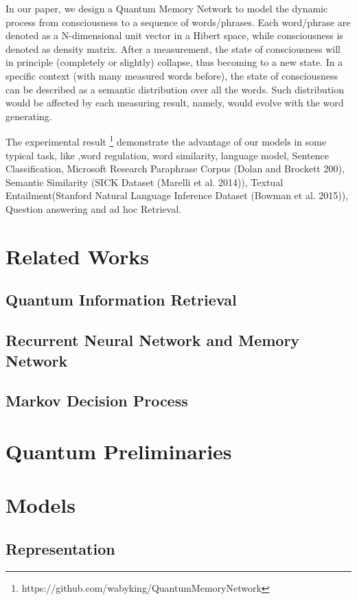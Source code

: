 \documentclass{sig-alternate-05-2015}
\begin{document}
In our paper, we design a Quantum Memory Network to model the dynamic process from consciousness to a sequence of words/phrases. Each word/phrase are denoted as a N-dimensional unit vector in a Hibert space, while consciousness is denoted as density matrix. After a measurement, the  state of consciousness will  in principle (completely or slightly) collapse, thus becoming to a new state.  In a specific context (with many measured words before), the state of consciousness can be described as a semantic distribution over all the words. Such distribution would be affected by each measuring result, namely, would evolve with the word generating.

The experimental result \footnote{https://github.com/wabyking/QuantumMemoryNetwork } demonstrate the advantage of our models in some typical task, like ,word regulation, word similarity, language model, Sentence Classification,  Microsoft Research Paraphrase Corpus (Dolan and Brockett 200),  Semantic Similarity (SICK Dataset (Marelli et al. 2014)), Textual Entailment(Stanford Natural Language Inference Dataset (Bowman et al. 2015)), Question answering and ad hoc Retrieval.





\section{Related Works}
\subsection{Quantum Information Retrieval}
\subsection{Recurrent Neural Network and Memory Network}
\subsection{Markov Decision Process}
\section{Quantum Preliminaries}
\section{Models}
\subsection{Representation}
\end{document}
